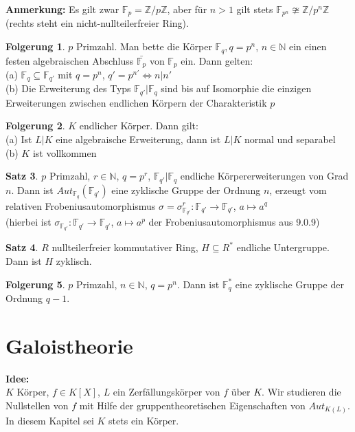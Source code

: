 \documentclass[10pt,a4paper,numbers=endperiod]{scrreprt}
\theoremstyle{definition}
\newtheorem{satz}{Satz}[section]
\newtheorem{folg}[satz]{Folgerung}
\def\NN{{\mathbb N}}
\def\ZZ{{\mathbb Z}}
\def\FF{{\mathbb F}}
\begin{document}
\textbf{Anmerkung:} Es gilt zwar $\FF_p = \ZZ/p\ZZ$, aber für $n > 1$ gilt stets $\FF_{p^n} \ncong \ZZ/p^n\ZZ$ (rechts steht ein nicht-nullteilerfreier Ring).

\begin{folg}
	$p$ Primzahl. Man bette die Körper $\FF_q, q = p^n$, $n \in \NN$ ein einen festen algebraischen Abschluss $\bar{\FF_p}$ von $\FF_p$ ein. Dann gelten:\\
	(a) $\FF_q \subseteq \FF_{q'}$ mit $q = p^n$, $q' = p^{n'} \Leftrightarrow n|n'$\\
	(b) Die Erweiterung des Typs $\FF_{q'}|\FF_q$ sind bis auf Isomorphie die einzigen Erweiterungen zwischen endlichen Körpern der Charakteristik $p$
\end{folg}

\begin{folg}
	$K$ endlicher Körper. Dann gilt:\\
	(a) Ist $L|K$ eine algebraische Erweiterung, dann ist $L|K$ normal und separabel\\
	(b) $K$ ist vollkommen
\end{folg}

\begin{satz}
	$p$ Primzahl, $r \in \NN$, $q = p^r$, $\FF_{q'}|\FF_q$ endliche Körpererweiterungen von Grad $n$. Dann ist $Aut_{\FF_q}(\FF_{q'})$ eine zyklische Gruppe der Ordnung $n$, erzeugt vom relativen Frobeniusautomorphismus $\sigma = \sigma_{\FF_{q'}}^r: \FF_{q'} \rightarrow \FF_{q'}$, $a \mapsto a^q$\\
	(hierbei ist $\sigma_{\FF_{q'}}: \FF_{q'} \rightarrow \FF_{q'}$, $a \mapsto a^p$ der Frobeniusautomorphismus aus 9.0.9)
\end{satz}

\begin{satz}
	$R$ nullteilerfreier kommutativer Ring, $H \subseteq R^*$ endliche Untergruppe.\\
	Dann ist $H$ zyklisch.
\end{satz}

\begin{folg}
	$p$ Primzahl, $n \in \NN$, $q = p^n$. Dann ist $\FF_q^*$ eine zyklische Gruppe der Ordnung $q - 1$.
\end{folg}

\part{Galoistheorie}

\textbf{Idee:}\\
$K$ Körper, $f \in K[X]$, $L$ ein Zerfällungskörper von $f$ über $K$. Wir studieren die Nullstellen von $f$ mit Hilfe der gruppentheoretischen Eigenschaften von $Aut_{K(L)}$.\\
In diesem Kapitel sei $K$ stets ein Körper.\\
\end{document}
